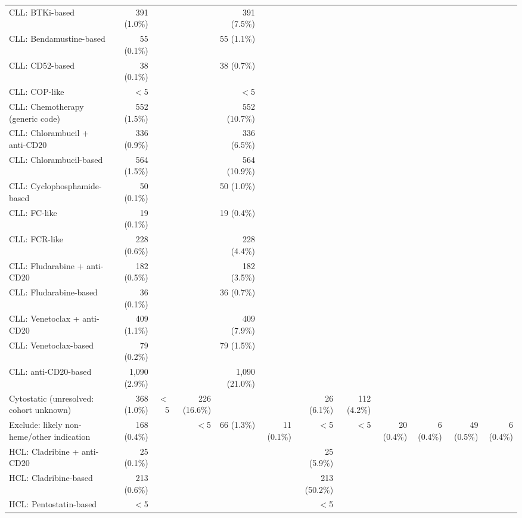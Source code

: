 \begin{table}
{\begin{tabular}{@{}lrrrrrrrrrrr@{}}
\quad CLL: BTKi-based & 391 (1.0\%) &  &  & 391 (7.5\%) &  &  &  &  &  &  &  \\
\quad CLL: Bendamustine-based & 55 (0.1\%) &  &  & 55 (1.1\%) &  &  &  &  &  &  &  \\
\quad CLL: CD52-based & 38 (0.1\%) &  &  & 38 (0.7\%) &  &  &  &  &  &  &  \\
\quad CLL: COP-like & $<$5 &  &  & $<$5 &  &  &  &  &  &  &  \\
\quad CLL: Chemotherapy (generic code) & 552 (1.5\%) &  &  & 552 (10.7\%) &  &  &  &  &  &  &  \\
\quad CLL: Chlorambucil + anti-CD20 & 336 (0.9\%) &  &  & 336 (6.5\%) &  &  &  &  &  &  &  \\
\quad CLL: Chlorambucil-based & 564 (1.5\%) &  &  & 564 (10.9\%) &  &  &  &  &  &  &  \\
\quad CLL: Cyclophosphamide-based & 50 (0.1\%) &  &  & 50 (1.0\%) &  &  &  &  &  &  &  \\
\quad CLL: FC-like & 19 (0.1\%) &  &  & 19 (0.4\%) &  &  &  &  &  &  &  \\
\quad CLL: FCR-like & 228 (0.6\%) &  &  & 228 (4.4\%) &  &  &  &  &  &  &  \\
\quad CLL: Fludarabine + anti-CD20 & 182 (0.5\%) &  &  & 182 (3.5\%) &  &  &  &  &  &  &  \\
\quad CLL: Fludarabine-based & 36 (0.1\%) &  &  & 36 (0.7\%) &  &  &  &  &  &  &  \\
\quad CLL: Venetoclax + anti-CD20 & 409 (1.1\%) &  &  & 409 (7.9\%) &  &  &  &  &  &  &  \\
\quad CLL: Venetoclax-based & 79 (0.2\%) &  &  & 79 (1.5\%) &  &  &  &  &  &  &  \\
\quad CLL: anti-CD20-based & 1,090 (2.9\%) &  &  & 1,090 (21.0\%) &  &  &  &  &  &  &  \\
\quad Cytostatic (unresolved: cohort unknown) & 368 (1.0\%) & $<$5 & 226 (16.6\%) &  &  & 26 (6.1\%) & 112 (4.2\%) &  &  &  &  \\
\quad Exclude: likely non-heme/other indication & 168 (0.4\%) &  & $<$5 & 66 (1.3\%) & 11 (0.1\%) & $<$5 & $<$5 & 20 (0.4\%) & 6 (0.4\%) & 49 (0.5\%) & 6 (0.4\%) \\
\quad HCL: Cladribine + anti-CD20 & 25 (0.1\%) &  &  &  &  & 25 (5.9\%) &  &  &  &  &  \\
\quad HCL: Cladribine-based & 213 (0.6\%) &  &  &  &  & 213 (50.2\%) &  &  &  &  &  \\
\quad HCL: Pentostatin-based & $<$5 &  &  &  &  & $<$5 &  &  &  &  &  \\

\end{tabular}}
\end{table}

